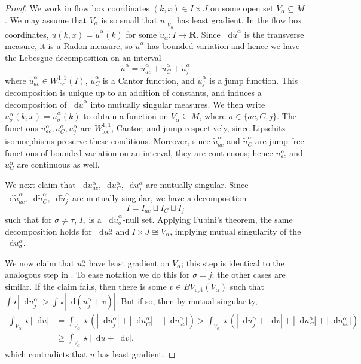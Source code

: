 \documentclass[reqno,11pt]{amsart}
\newcommand{\RR}{\mathbf{R}}
\newcommand*\dif{\mathop{}\!\mathrm{d}}
\newcommand{\loc}{\mathrm{loc}}
\newcommand{\cpt}{\mathrm{cpt}}
\theoremstyle{definition}
\numberwithin{equation}{section}
\begin{document}
\begin{proof}
We work in flow box coordinates $(k, x) \in I \times J$ on some open set $V_\alpha \subseteq M$.
We may assume that $V_\alpha$ is so small that $u|_{V_\alpha}$ has least gradient.
In the flow box coordinates, $u(k, x) = \tilde u^\alpha(k)$ for some $\tilde u_\alpha: I \to \RR$. 
Since $\dif \tilde u^\alpha$ is the transverse measure, it is a Radon measure, so $\tilde u^\alpha$ has bounded variation and hence we have the Lebesgue decomposition on an interval \cite[Corollary 3.33]{Ambrosio2000FunctionsOB} 
$$\tilde u^\alpha = \tilde u^\alpha_{ac} + \tilde u^\alpha_C + \tilde u^\alpha_j$$
where $\tilde u^\alpha_{ac} \in W^{1, 1}_\loc(I)$, $\tilde u^\alpha_C$ is a Cantor function, and $\tilde u_j^\alpha$ is a jump function.
This decomposition is unique up to an addition of constants, and induces a decomposition of $\dif \tilde u^\alpha$ into mutually singular measures.
We then write $u^\alpha_\sigma(k, x) = \tilde u^\alpha_\sigma(k)$ to obtain a function on $V_\alpha \subseteq M$, where $\sigma \in \{ac, C, j\}$.
The functions $u^\alpha_{ac}, u^\alpha_C, u^\alpha_j$ are $W^{1,1}_\loc$, Cantor, and jump respectively, since Lipschitz isomorphisms preserve these conditions.
Moreover, since $\tilde u^\alpha_{ac}$ and $\tilde u^\alpha_C$ are jump-free functions of bounded variation on an interval, they are continuous; hence $u^\alpha_{ac}$ and $u^\alpha_C$ are continuous as well.

We next claim that $\dif u^\alpha_{ac}, \dif u^\alpha_C, \dif u^\alpha_j$ are mutually singular.
Since $\dif \tilde u^\alpha_{ac}, \dif \tilde u^\alpha_C, \dif \tilde u^\alpha_j$ are mutually singular, we have a decomposition
$$I = I_{ac} \sqcup I_C \sqcup I_j$$
such that for $\sigma \neq \tau$, $I_\tau$ is a $\dif \tilde u^\alpha_\sigma$-null set.
Applying Fubini's theorem, the same decomposition holds for $\dif u^\alpha_\sigma$ and $I \times J \cong V_\alpha$, implying mutual singularity of the $\dif u^\alpha_\sigma$.

We now claim that $u^\alpha_\sigma$ have least gradient on $V_\alpha$; this step is identical to the analogous step in \cite{górny2017planar}.
To ease notation we do this for $\sigma = j$; the other cases are similar.
If the claim fails, then there is some $v \in BV_\cpt(V_\alpha)$ such that $\int \star |\dif u^\alpha_j| > \int \star |\dif (u^\alpha_j + v)|$.
But if so, then by mutual singularity,
\begin{align*}
\int_{V_\alpha} \star |\dif u| &= \int_{V_\alpha} \star (|\dif u^\alpha_j| + |\dif u^\alpha_C| + |\dif u^\alpha_{ac}|) 
>  \int_{V_\alpha} \star (|\dif u^\alpha_j + \dif v| + |\dif u^\alpha_C| + |\dif u^\alpha_{ac}|) \\
&\geq \int_{V_\alpha} \star |\dif u + \dif v|,
\end{align*}
which contradicts that $u$ has least gradient.


\end{proof}
\end{document}
